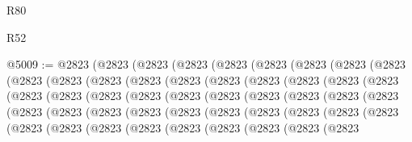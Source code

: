 \begin{lexlean}{R80}
\begin{lexlean}{R52}
\begin{coremodule}
{{{{{{{{{{{{{{{{{{{{{{{{{{{{{{{{{{{{{{{{{{{{{{{{{{{{{{{{{{{{{{{{{{{{{{{{{{{{{{{{{{{{{{{{{{{{{{{{{{{{{{{{{{{{{{{{{{{{{{{{{{{{{{{{{{{{{{{{{{{{{{{{{{{{{{{{{{{{{{{{{{{{{{{{{{{{{{{{{{{{{{{{{{{{{{{{{{{{{{@5009 := @2823
    (@2823
      (@2823
        (@2823
          (@2823
            (@2823
              (@2823
                (@2823
                  (@2823
                    (@2823
                      (@2823
                        (@2823
                          (@2823
                            (@2823
                              (@2823
                                (@2823
                                  (@2823
                                    (@2823
                                      (@2823
                                        (@2823
                                          (@2823
                                            (@2823
                                              (@2823
                                                (@2823
                                                  (@2823
                                                    (@2823
                                                      (@2823
                                                        (@2823
                                                          (@2823
                                                            (@2823
                                                              (@2823
                                                                (@2823
                                                                  (@2823
                                                                    (@2823
                                                                      (@2823
                                                                        (@2823
                                                                          (@2823
                                                                            (@2823
                                                                              (@2823
                                                                                (@2823
                                                                                  (@2823
                                                                                    (@2823
                                                                                      (@2823
                                                                                        (@2823
                                                                                          (@2823
                                                                                            (@2823
                                                                                              (@2823
                                                                                                (@2823
}}}}}}}}}}}}}}}}}}}}}}}}}}}}}}}}}}}}}}}}}}}}}}}}}}}}}}}}}}}}}}}}}}}}}}}}}}}}}}}}}}}}}}}}}}}}}}}}}}}}}}}}}}}}}}}}}}}}}}}}}}}}}}}}}}}}}}}}}}}}}}}}}}}}}}}}}}}}}}}}}}}}}}}}}}}}}}}}}}}}}}}}}}}}}}}}}}}}}}
\end{coremodule}
\end{lexlean}
\end{lexlean}
